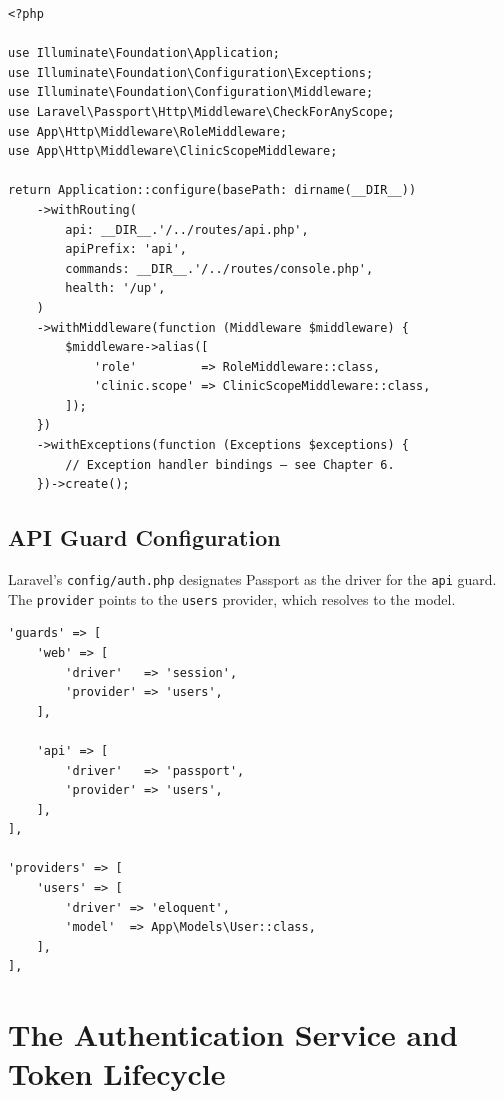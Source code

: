 \begin{lstlisting}[style=php, caption={\texttt{bootstrap/app.php} ---
  Passport registration and API guard configuration.}]
<?php

use Illuminate\Foundation\Application;
use Illuminate\Foundation\Configuration\Exceptions;
use Illuminate\Foundation\Configuration\Middleware;
use Laravel\Passport\Http\Middleware\CheckForAnyScope;
use App\Http\Middleware\RoleMiddleware;
use App\Http\Middleware\ClinicScopeMiddleware;

return Application::configure(basePath: dirname(__DIR__))
    ->withRouting(
        api: __DIR__.'/../routes/api.php',
        apiPrefix: 'api',
        commands: __DIR__.'/../routes/console.php',
        health: '/up',
    )
    ->withMiddleware(function (Middleware $middleware) {
        $middleware->alias([
            'role'         => RoleMiddleware::class,
            'clinic.scope' => ClinicScopeMiddleware::class,
        ]);
    })
    ->withExceptions(function (Exceptions $exceptions) {
        // Exception handler bindings — see Chapter 6.
    })->create();
\end{lstlisting}

\subsection{API Guard Configuration}

Laravel's \texttt{config/auth.php} designates Passport as the driver
for the \texttt{api} guard. The \texttt{provider} points to the
\texttt{users} provider, which resolves to the  model.

\begin{lstlisting}[style=php, caption={\texttt{config/auth.php} ---
  API guard using the Passport driver.}]
'guards' => [
    'web' => [
        'driver'   => 'session',
        'provider' => 'users',
    ],

    'api' => [
        'driver'   => 'passport',
        'provider' => 'users',
    ],
],

'providers' => [
    'users' => [
        'driver' => 'eloquent',
        'model'  => App\Models\User::class,
    ],
],
\end{lstlisting}

\section{The Authentication Service and Token Lifecycle}
\label{sec:auth-service}

